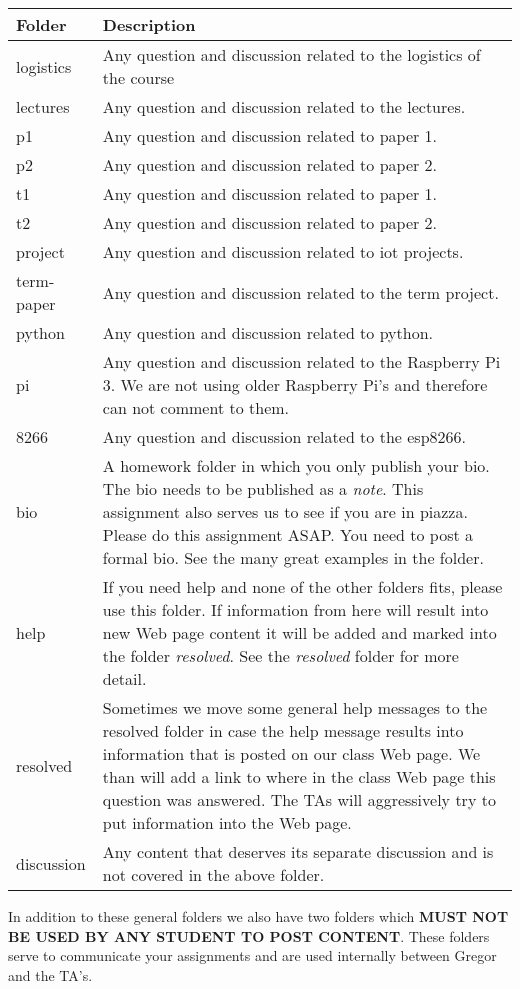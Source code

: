 \begin{tabular}{p{2cm}p{11cm}}
Folder & Description \\
\toprule
logistics &
Any question and discussion related to the logistics of the course
\\
lectures &
Any question and discussion related to the lectures.
\\
p1 &
Any question and discussion related to paper 1.
\\
p2 &
Any question and discussion related to paper 2.
\\
t1 &
Any question and discussion related to paper 1.
\\
t2 &
Any question and discussion related to paper 2.
\\
project &
Any question and discussion related to iot projects.
\\
term-paper &
Any question and discussion related to the term project.
\\
python &
Any question and discussion related to python.
\\
pi &
Any question and discussion related to the Raspberry Pi 3. We are not
using older Raspberry Pi's and therefore can not comment to them.
\\
8266 &
Any question and discussion related to the esp8266.
\\
bio &
A homework folder in which you only publish your bio. The bio needs to
be published as a \emph{note}. This assignment also serves us to see if
you are in piazza. Please do this assignment ASAP. You need to post a
formal bio. See the many great examples in the folder.
\\
help &
If you need help and none of the other folders fits, please use this
folder. If information from here will result into new Web page content
it will be added and marked into the folder \emph{resolved}. See the
\emph{resolved} folder for more detail.
\\
resolved &
Sometimes we move some general help messages to the resolved folder in
case the help message results into information that is posted on our
class Web page. We than will add a link to where in the class Web page
this question was answered. The TAs will aggressively try to put
information into the Web page.
\\
discussion &
Any content that deserves its separate discussion and is not covered in
the above folder. \\
\bottomrule
\end{tabular}

In addition to these general folders we also have two folders which
\textbf{MUST NOT BE USED BY ANY STUDENT TO POST CONTENT}. These folders
serve to communicate your assignments and are used internally between
Gregor and the TA's.


